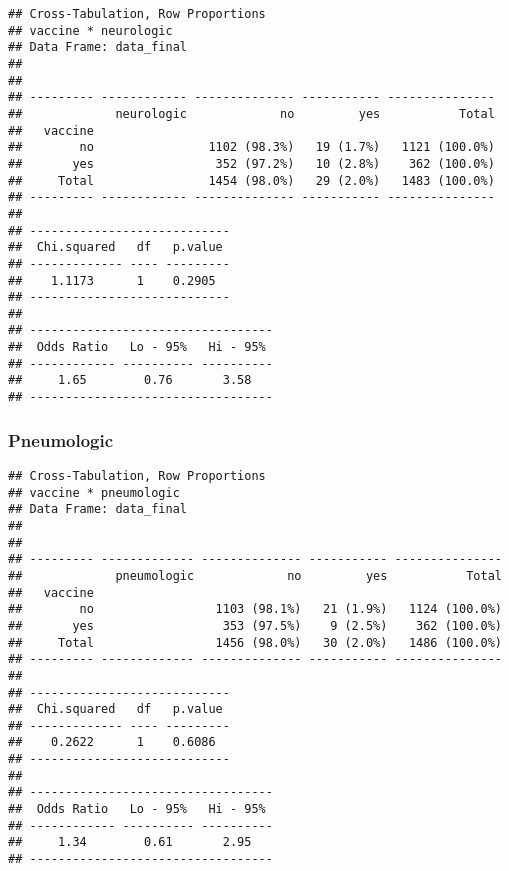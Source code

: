 \documentclass[
]{article}
\newenvironment{Shaded}{\begin{snugshade}}{\end{snugshade}}
\newcommand{\AttributeTok}[1]{\textcolor[rgb]{0.77,0.63,0.00}{#1}}
\newcommand{\ConstantTok}[1]{\textcolor[rgb]{0.00,0.00,0.00}{#1}}
\newcommand{\FunctionTok}[1]{\textcolor[rgb]{0.00,0.00,0.00}{#1}}
\newcommand{\NormalTok}[1]{#1}
\newcommand{\SpecialCharTok}[1]{\textcolor[rgb]{0.00,0.00,0.00}{#1}}
\newcommand{\StringTok}[1]{\textcolor[rgb]{0.31,0.60,0.02}{#1}}
\begin{document}
\begin{verbatim}
## Cross-Tabulation, Row Proportions  
## vaccine * neurologic  
## Data Frame: data_final  
## 
## 
## --------- ------------ -------------- ----------- ---------------
##             neurologic             no         yes           Total
##   vaccine                                                        
##        no                1102 (98.3%)   19 (1.7%)   1121 (100.0%)
##       yes                 352 (97.2%)   10 (2.8%)    362 (100.0%)
##     Total                1454 (98.0%)   29 (2.0%)   1483 (100.0%)
## --------- ------------ -------------- ----------- ---------------
## 
## ----------------------------
##  Chi.squared   df   p.value 
## ------------- ---- ---------
##    1.1173      1    0.2905  
## ----------------------------
## 
## ----------------------------------
##  Odds Ratio   Lo - 95%   Hi - 95% 
## ------------ ---------- ----------
##     1.65        0.76       3.58   
## ----------------------------------
\end{verbatim}

\hypertarget{pneumologic}{%
\subsubsection{Pneumologic}\label{pneumologic}}

\begin{Shaded}
\end{Shaded}

\begin{verbatim}
## Cross-Tabulation, Row Proportions  
## vaccine * pneumologic  
## Data Frame: data_final  
## 
## 
## --------- ------------- -------------- ----------- ---------------
##             pneumologic             no         yes           Total
##   vaccine                                                         
##        no                 1103 (98.1%)   21 (1.9%)   1124 (100.0%)
##       yes                  353 (97.5%)    9 (2.5%)    362 (100.0%)
##     Total                 1456 (98.0%)   30 (2.0%)   1486 (100.0%)
## --------- ------------- -------------- ----------- ---------------
## 
## ----------------------------
##  Chi.squared   df   p.value 
## ------------- ---- ---------
##    0.2622      1    0.6086  
## ----------------------------
## 
## ----------------------------------
##  Odds Ratio   Lo - 95%   Hi - 95% 
## ------------ ---------- ----------
##     1.34        0.61       2.95   
## ----------------------------------
\end{verbatim}
\end{document}
